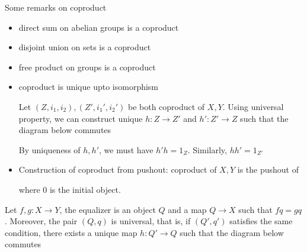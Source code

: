 \documentclass{report}
\begin{document}
\begin{remark}
    Some remarks on coproduct
    \begin{itemize}
        \item direct sum on abelian groups is a coproduct
        \item disjoint union on sets is a coproduct
        \item free product on groups is a coproduct
        \item coproduct is unique upto isomorphism
        \begin{longproof}
            Let $(Z, i_1, i_2), (Z', i_1', i_2')$ be both coproduct of $X, Y$. Using universal property, we can construct unique $h: Z \to Z'$ and $h': Z' \to Z$ such that the diagram below commutes
            \begin{center}
            \end{center}
            By uniqueness of $h, h'$, we must have $h' h = 1_Z$. Similarly, $h h' = 1_{Z'}$
        \end{longproof}
        
        \item Construction of coproduct from pushout: coproduct of $X, Y$ is the pushout of  where $0$ is the initial object.
        
    \end{itemize}
\end{remark}

\begin{definition}[equalizer]
    Let $f, g: X \to Y$, the equalizer is an object $Q$ and a map $Q \to X$ such that $fq = gq$. Moreover, the pair $(Q, q)$ is universal, that is, if $(Q', q')$ satisfies the same condition, there exists a unique map $h: Q' \to Q$ such that the diagram below commutes
    \begin{center}
    \end{center}
\end{definition}
\end{document}
